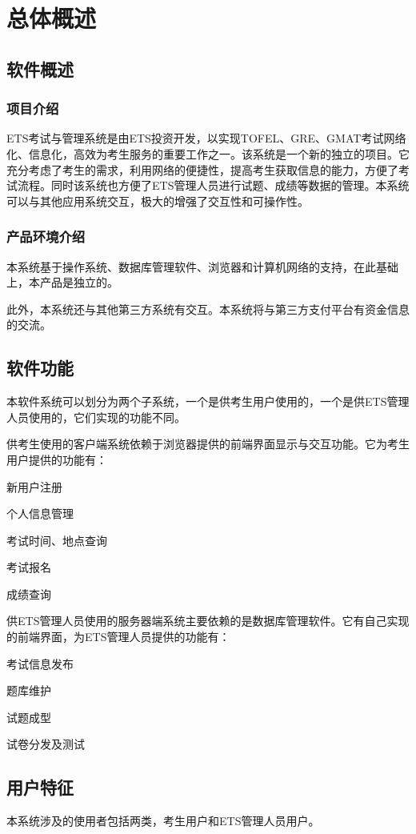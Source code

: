 \chapter{总体概述}

\section{软件概述}

\subsection{项目介绍}
ETS考试与管理系统是由ETS投资开发，以实现TOFEL、GRE、GMAT考试网络化、信息化，高效为考生服务的重要工作之一。该系统是一个新的独立的项目。它充分考虑了考生的需求，利用网络的便捷性，提高考生获取信息的能力，方便了考试流程。同时该系统也方便了ETS管理人员进行试题、成绩等数据的管理。本系统可以与其他应用系统交互，极大的增强了交互性和可操作性。

\subsection{产品环境介绍}
本系统基于操作系统、数据库管理软件、浏览器和计算机网络的支持，在此基础上，本产品是独立的。

此外，本系统还与其他第三方系统有交互。本系统将与第三方支付平台有资金信息的交流。

\section{软件功能}
本软件系统可以划分为两个子系统，一个是供考生用户使用的，一个是供ETS管理人员使用的，它们实现的功能不同。

供考生使用的客户端系统依赖于浏览器提供的前端界面显示与交互功能。它为考生用户提供的功能有：

新用户注册

个人信息管理

考试时间、地点查询

考试报名

成绩查询

供ETS管理人员使用的服务器端系统主要依赖的是数据库管理软件。它有自己实现的前端界面，为ETS管理人员提供的功能有：

考试信息发布

题库维护

试题成型

试卷分发及测试

\section{用户特征}
本系统涉及的使用者包括两类，考生用户和ETS管理人员用户。

